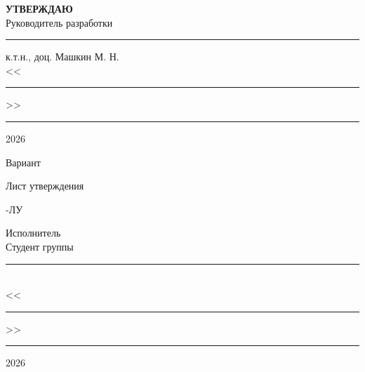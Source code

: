 \thispagestyle{firststyle}
\begin{flushright}
	\noindent\textbf{\large УТВЕРЖДАЮ}\\
	Руководитель разработки\\
	\rule{2.5cm}{.6pt} к.т.н., доц. Машкин М. Н.\\
	<<\rule{7mm}{.6pt}>> \rule{3cm}{.6pt} 2026
\end{flushright}

\vfill\vfill

\begin{center}
\bfseries\large
\doctitle

\bigskip
Вариант \variant

\bigskip
\docname

\bigskip
Лист утверждения

\bigskip
\docstamp-ЛУ
\end{center}

\vfill

\begin{flushright}
	\noindent Исполнитель\\
	Студент группы \grp\\
	\rule{2.5cm}{.6pt} \shname\\
	<<\rule{7mm}{.6pt}>> \rule{3cm}{.6pt} 2026
\end{flushright}

\vfill

\reversemarginpar{}